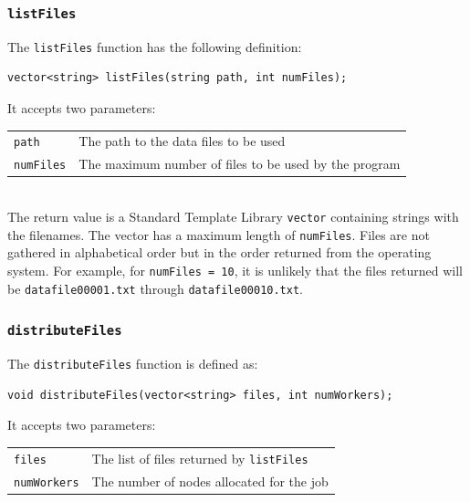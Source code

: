 \documentclass{article}
\begin{document}
\subsubsection{\texttt{listFiles}}\label{sec:listfiles}

The \texttt{listFiles} function has the following definition:

\lstset{language=C++, keepspaces=true}
\begin{lstlisting}
vector<string> listFiles(string path, int numFiles); 
\end{lstlisting}

It accepts two parameters: \\

\begin{tabular}{l l}
\texttt{path} & The path to the data files to be used \\
\texttt{numFiles} & The maximum number of files to be used by the program \\
\end{tabular}\\

The return value is a Standard Template Library \texttt{vector} containing strings with the filenames. The vector has a maximum length of \texttt{numFiles}. Files are not gathered in alphabetical order but in the order returned from the operating system. For example, for \texttt{numFiles = 10}, it is unlikely that the files returned will be \texttt{datafile00001.txt} through \texttt{datafile00010.txt}.


%
%

\subsubsection{\texttt{distributeFiles}}\label{sec:distributefiles}

The \texttt{distributeFiles} function is defined as:

\lstset{language=C++, keepspaces=true}
\begin{lstlisting}
void distributeFiles(vector<string> files, int numWorkers);
\end{lstlisting}

It accepts two parameters: \\

\begin{tabular}{l l}
\texttt{files} & The list of files returned by \texttt{listFiles} \\
\texttt{numWorkers} & The number of nodes allocated for the job \\
\end{tabular} \\
\end{document}
